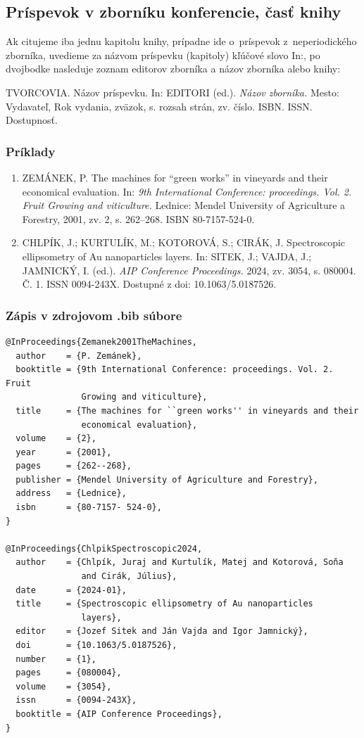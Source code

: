 \documentclass[../../../thesis.tex]{subfiles}
\begin{document}
\subsection{Príspevok v zborníku konferencie, časť knihy}
Ak citujeme iba jednu kapitolu knihy,
prípadne ide o~príspevok z~neperiodického zborníka,
uvedieme za názvom príspevku (kapitoly)
kľúčové slovo In:, po dvojbodke nasleduje zoznam editorov zborníka a názov zborníka alebo knihy:
\begin{trivlist}
  \item TVORCOVIA. Názov príspevku. In: EDITORI (ed.). \textit{Názov zborníka.} Mesto: Vydavateľ, Rok vydania, zväzok, s. rozsah strán, zv. číslo. ISBN. ISSN. Dostupnosť.
\end{trivlist}

\subsubsection*{\normalsize Príklady}
\begin{enumerate}
  \item ZEMÁNEK, P. The machines for ``green works'' in vineyards and their economical evaluation. In: \textit{9th International Conference: proceedings. Vol. 2. Fruit Growing and viticulture.} Lednice: Mendel University of Agriculture a Forestry, 2001, zv. 2, s. 262–268. ISBN 80-7157-524-0.

  \item CHLPÍK, J.; KURTULÍK, M.; KOTOROVÁ, S.; CIRÁK, J. Spectroscopic ellipsometry of Au nanoparticles layers. In: SITEK, J.; VAJDA, J.; JAMNICKÝ, I. (ed.). \textit{AIP Conference Proceedings.} 2024, zv. 3054, s. 080004. Č. 1. ISSN 0094-243X. Dostupné z doi: 10.1063/5.0187526.
\end{enumerate}

\subsubsection*{\normalsize Zápis v zdrojovom .bib súbore}
\begin{verbatim}
@InProceedings{Zemanek2001TheMachines,
  author    = {P. Zemánek},
  booktitle = {9th International Conference: proceedings. Vol. 2. Fruit
               Growing and viticulture},
  title     = {The machines for ``green works'' in vineyards and their
               economical evaluation},
  volume    = {2},
  year      = {2001},
  pages     = {262--268},
  publisher = {Mendel University of Agriculture and Forestry},
  address   = {Lednice},
  isbn      = {80-7157- 524-0},
}

@InProceedings{ChlpikSpectroscopic2024,
  author    = {Chlpík, Juraj and Kurtulík, Matej and Kotorová, Soňa
               and Cirák, Július},
  date      = {2024-01},
  title     = {Spectroscopic ellipsometry of Au nanoparticles
               layers},
  editor    = {Jozef Sitek and Ján Vajda and Igor Jamnický},
  doi       = {10.1063/5.0187526},
  number    = {1},
  pages     = {080004},
  volume    = {3054},
  issn      = {0094-243X},
  booktitle = {AIP Conference Proceedings},
}
\end{verbatim}
\end{document}

